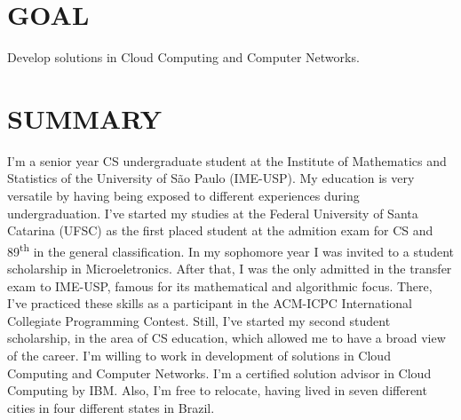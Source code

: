 \documentclass[margin=<value>,11pt]{res} %
\begin{document}

\address{R. Indiana, 998 -- São Paulo, SP 04562-001 -- Brazil\\
        (+55 11) 97132-1145, (+55 11) 2389-7150 \\ \texttt{pedro@vezza.com.br}}

\begin{resume}
 
\section{GOAL}
	Develop solutions in Cloud Computing and Computer Networks.
 
\section{SUMMARY}
I'm a senior year CS undergraduate student at the Institute of Mathematics and Statistics of the University of São Paulo (IME-USP). My education is very versatile by having being exposed to different experiences during undergraduation. I've started my studies at the Federal University of Santa Catarina (UFSC) as the first placed student at the admition exam for CS and 89\textsuperscript{th} in the general classification. In my sophomore year I was invited to a student scholarship in Microeletronics. After that, I was the only admitted in the transfer exam to IME-USP, famous for its mathematical and algorithmic focus. There, I've practiced these skills as a participant in the ACM-ICPC International Collegiate Programming Contest. Still, I've started my second student scholarship, in the area of CS education, which allowed me to have a broad view of the career. I'm willing to work in development of solutions in Cloud Computing and Computer Networks. I'm a certified solution advisor in Cloud Computing by IBM. Also, I'm free to relocate, having lived in seven different cities in four different states in Brazil.


\end{resume}
\end{document}
